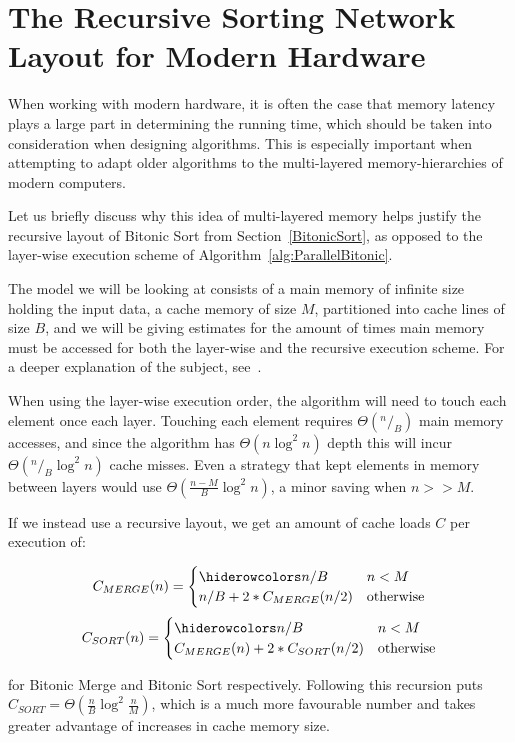 \FloatBarrier
\section{The Recursive Sorting Network Layout for Modern Hardware}
\label{sec:BitonicCache}

When working with modern hardware, it is often the case that memory latency plays a large part in determining the running time, which should be taken into consideration when designing algorithms. This is especially important when attempting to adapt older algorithms to the multi-layered memory-hierarchies of modern computers.

Let us briefly discuss why this idea of multi-layered memory helps justify the recursive layout of Bitonic Sort from Section~\ref{BitonicSort}, as opposed to the layer-wise execution scheme of Algorithm~\ref{alg:ParallelBitonic}.

The model we will be looking at consists of a main memory of infinite size holding the input data, a cache memory of size $M$, partitioned into cache lines of size $B$, and we will be giving estimates for the amount of times main memory must be accessed for both the layer-wise and the recursive execution scheme. For a deeper explanation of the subject, see~.

When using the layer-wise execution order, the algorithm will need to touch each element once each layer. Touching each element requires $\Theta(^n/_B)$ main memory accesses, and since the algorithm has $\Theta(n \log^2 n)$ depth this will incur $\Theta(^n/_B\log^2 n)$ cache misses. Even a strategy that kept elements in memory between layers would use $\Theta(\frac{n-M}{B}\log^2 n)$, a minor saving when $n >> M$.

If we instead use a recursive layout, we get an amount of cache loads $C$ per execution of:

\[
C_{MERGE}(n)=
\begin{cases}
\hiderowcolors
n/B & n<M \\
n/B + 2*C_{MERGE}(n/2) & \text{otherwise}
\end{cases}
\]
\[
C_{SORT}(n)=
\begin{cases}
\hiderowcolors
n/B & n<M \\
C_{MERGE}(n) + 2*C_{SORT}(n/2) & \text{otherwise}
\end{cases}
\]

\noindent
for Bitonic Merge and Bitonic Sort respectively. Following this recursion puts $C_{SORT} = \Theta(\frac{n}{B}\log^2 \frac{n}{M})$, which is a much more favourable number and takes greater advantage of increases in cache memory size.

